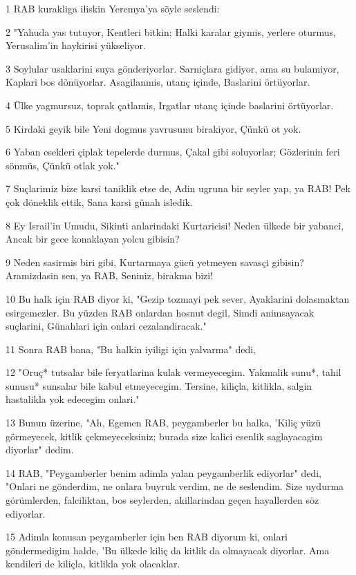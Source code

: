 \par 1 RAB kurakliga iliskin Yeremya'ya söyle seslendi:
\par 2 "Yahuda yas tutuyor, Kentleri bitkin; Halki karalar giymis, yerlere oturmus, Yerusalim'in haykirisi yükseliyor.
\par 3 Soylular usaklarini suya gönderiyorlar. Sarniçlara gidiyor, ama su bulamiyor, Kaplari bos dönüyorlar. Asagilanmis, utanç içinde, Baslarini örtüyorlar.
\par 4 Ülke yagmursuz, toprak çatlamis, Irgatlar utanç içinde baslarini örtüyorlar.
\par 5 Kirdaki geyik bile Yeni dogmus yavrusunu birakiyor, Çünkü ot yok.
\par 6 Yaban esekleri çiplak tepelerde durmus, Çakal gibi soluyorlar; Gözlerinin feri sönmüs, Çünkü otlak yok."
\par 7 Suçlarimiz bize karsi taniklik etse de, Adin ugruna bir seyler yap, ya RAB! Pek çok döneklik ettik, Sana karsi günah isledik.
\par 8 Ey Israil'in Umudu, Sikinti anlarindaki Kurtaricisi! Neden ülkede bir yabanci, Ancak bir gece konaklayan yolcu gibisin?
\par 9 Neden sasirmis biri gibi, Kurtarmaya gücü yetmeyen savasçi gibisin? Aramizdasin sen, ya RAB, Seniniz, birakma bizi!
\par 10 Bu halk için RAB diyor ki, "Gezip tozmayi pek sever, Ayaklarini dolasmaktan esirgemezler. Bu yüzden RAB onlardan hosnut degil, Simdi animsayacak suçlarini, Günahlari için onlari cezalandiracak."
\par 11 Sonra RAB bana, "Bu halkin iyiligi için yalvarma" dedi,
\par 12 "Oruç* tutsalar bile feryatlarina kulak vermeyecegim. Yakmalik sunu*, tahil sunusu* sunsalar bile kabul etmeyecegim. Tersine, kiliçla, kitlikla, salgin hastalikla yok edecegim onlari."
\par 13 Bunun üzerine, "Ah, Egemen RAB, peygamberler bu halka, 'Kiliç yüzü görmeyecek, kitlik çekmeyeceksiniz; burada size kalici esenlik saglayacagim diyorlar" dedim.
\par 14 RAB, "Peygamberler benim adimla yalan peygamberlik ediyorlar" dedi, "Onlari ne gönderdim, ne onlara buyruk verdim, ne de seslendim. Size uydurma görümlerden, falciliktan, bos seylerden, akillarindan geçen hayallerden söz ediyorlar.
\par 15 Adimla konusan peygamberler için ben RAB diyorum ki, onlari göndermedigim halde, 'Bu ülkede kiliç da kitlik da olmayacak diyorlar. Ama kendileri de kiliçla, kitlikla yok olacaklar.
